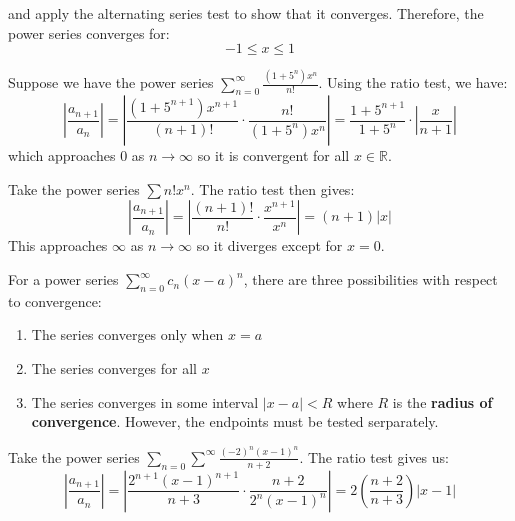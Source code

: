 \begin{itemize}
\begin{example}
        and apply the alternating series test to show that it converges. Therefore, the power series converges for:
        \begin{equation}
            -1 \le x \le 1
        \end{equation}
    \end{example}
    \begin{example}
        Suppose we have the power series $\sum_{n=0}^\infty \frac{(1+5^n)x^n}{n!}$. Using the ratio test, we have:
        \begin{equation}
            \left|\frac{a_{n+1}}{a_n}\right| = \left|\frac{(1+5^{n+1})x^{n+1}}{(n+1)! }\cdot \frac{n!}{(1+5^n)x^n}\right| = \frac{1+5^{n+1}}{1+5^n} \cdot \left|\frac{x}{n+1}\right|
        \end{equation}
        which approaches $0$ as $n\to\infty$ so it is convergent for all $x \in \mathbb{R}$.
    \end{example}
    \begin{example}
        Take the power series $\sum n! x^n$. The ratio test then gives:
        \begin{equation}
            \left|\frac{a_{n+1}}{a_n}\right| = \left|\frac{(n+1)!}{n!} \cdot \frac{x^{n+1}}{x^n}\right| = (n+1)|x|
        \end{equation}
        This approaches $\infty$ as $n\to\infty$ so it diverges except for $x=0$.
    \end{example}
    \begin{theorem}
        For a power series $\sum_{n=0}^\infty c_n (x-a)^n$, there are three possibilities with respect to convergence:
        \begin{enumerate}
            \item The series converges only when $x=a$
            \item The series converges for all $x$
            \item The series converges in some interval $|x-a| < R$ where $R$ is the \textbf{radius of convergence}. However, the endpoints must be tested serparately.
        \end{enumerate}
    \end{theorem}
    \begin{example}
        Take the power series $\sum_{n=0}\sum^\infty \frac{(-2)^n (x-1)^n}{n+2}$. The ratio test gives us:
        \begin{equation}
            \left|\frac{a_{n+1}}{a_n}\right| = \left|\frac{2^{n+1}(x-1)^{n+1}}{n+3} \cdot \frac{n+2}{2^n(x-1)^n}\right| = 2\left(\frac{n+2}{n+3}\right)|x-1|

\end{equation}
\end{example}
\end{itemize}
